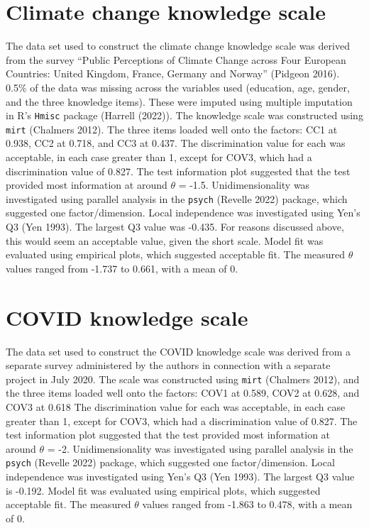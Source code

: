 \documentclass[11pt,halfline,a4paper,]{ouparticle}
\begin{document}
\hypertarget{climate-change-knowledge-scale}{%
\section{Climate change knowledge
scale}\label{climate-change-knowledge-scale}}

The data set used to construct the climate change knowledge scale was
derived from the survey ``Public Perceptions of Climate Change across
Four European Countries: United Kingdom, France, Germany and Norway''
(Pidgeon 2016). 0.5\% of the data was missing across the variables used
(education, age, gender, and the three knowledge items). These were
imputed using multiple imputation in R's \texttt{Hmisc} package (Harrell
(2022)). The knowledge scale was constructed using \texttt{mirt}
(Chalmers 2012). The three items loaded well onto the factors: CC1 at
0.938, CC2 at 0.718, and CC3 at 0.437. The discrimination value for each
was acceptable, in each case greater than 1, except for COV3, which had
a discrimination value of 0.827. The test information plot suggested
that the test provided most information at around \(\theta\) = -1.5.
Unidimensionality was investigated using parallel analysis in the
\texttt{psych} (Revelle 2022) package, which suggested one
factor/dimension. Local independence was investigated using Yen's Q3
(Yen 1993). The largest Q3 value was -0.435. For reasons discussed
above, this would seem an acceptable value, given the short scale. Model
fit was evaluated using empirical plots, which suggested acceptable fit.
The measured \(\theta\) values ranged from -1.737 to 0.661, with a mean
of 0.

\hypertarget{covid-knowledge-scale}{%
\section{COVID knowledge scale}\label{covid-knowledge-scale}}

The data set used to construct the COVID knowledge scale was derived
from a separate survey administered by the authors in connection with a
separate project in July 2020. The scale was constructed using
\texttt{mirt} (Chalmers 2012), and the three items loaded well onto the
factors: COV1 at 0.589, COV2 at 0.628, and COV3 at 0.618 The
discrimination value for each was acceptable, in each case greater than
1, except for COV3, which had a discrimination value of 0.827. The test
information plot suggested that the test provided most information at
around \(\theta\) = -2. Unidimensionality was investigated using
parallel analysis in the \texttt{psych} (Revelle 2022) package, which
suggested one factor/dimension. Local independence was investigated
using Yen's Q3 (Yen 1993). The largest Q3 value is -0.192. Model fit was
evaluated using empirical plots, which suggested acceptable fit. The
measured \(\theta\) values ranged from -1.863 to 0.478, with a mean of
0.
\end{document}
